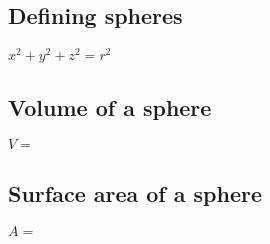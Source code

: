 
\subsection{Defining spheres}

\(x^2+y^2+z^2 = r^2\)

\subsection{Volume of a sphere}

\(V=\)

\subsection{Surface area of a sphere}

\(A=\)

